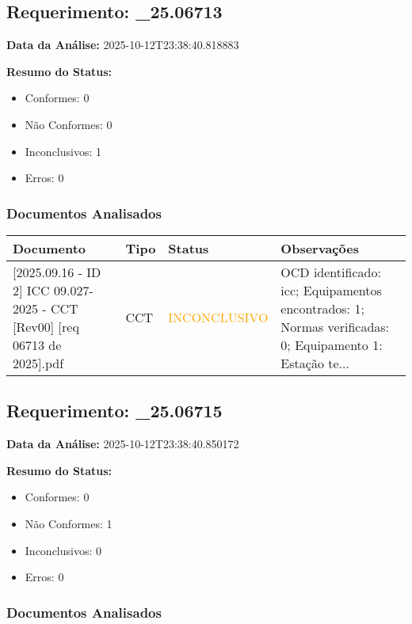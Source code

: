 \documentclass[12pt,a4paper]{article}
\begin{document}
\subsection{Requerimento: \_25.06713}

\textbf{Data da Análise:} 2025-10-12T23:38:40.818883

\textbf{Resumo do Status:}
\begin{itemize}
    \item Conformes: 0
    \item Não Conformes: 0
    \item Inconclusivos: 1
    \item Erros: 0
\end{itemize}

\subsubsection{Documentos Analisados}

\begin{longtable}{|p{4cm}|p{2cm}|p{2cm}|p{6cm}|}
\hline
\textbf{Documento} & \textbf{Tipo} & \textbf{Status} & \textbf{Observações} \\
\hline
\endhead
[Certificado de Conformidade Técnica - CCT][2025.09.16 - ID 2] ICC 09.027-2025 - CCT [Rev00] [req 06713 de  2025].pdf & CCT & \textcolor{orange}{INCONCLUSIVO} & OCD identificado: icc; Equipamentos encontrados: 1; Normas verificadas: 0; Equipamento 1: Estação te... \\
\hline
\end{longtable}


\subsection{Requerimento: \_25.06715}

\textbf{Data da Análise:} 2025-10-12T23:38:40.850172

\textbf{Resumo do Status:}
\begin{itemize}
    \item Conformes: 0
    \item Não Conformes: 1
    \item Inconclusivos: 0
    \item Erros: 0
\end{itemize}

\subsubsection{Documentos Analisados}
\end{document}
